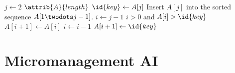 \documentclass{llncs}
\begin{document}
\begin{codebox}
\li \For $j \gets 2$ \To $\attrib{A}{length}$
\li \Do
$\id{key} \gets A[j]$
\li \Comment Insert $A[j]$ into the sorted sequence
$A[1 \twodots j-1]$.
\li $i \gets j-1$
\li \While $i > 0$ and $A[i] > \id{key}$
\li \Do
$A[i+1] \gets A[i]$
\li $i \gets i-1$
\End
\li $A[i+1] \gets \id{key}$
\End
\end{codebox}

\section{Micromanagement AI}
\subsection{}


\end{document}

